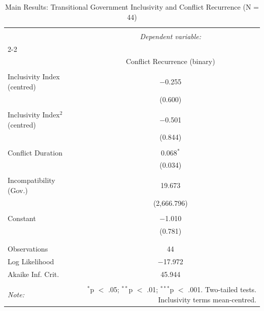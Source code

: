 
\begin{table}[!htbp] \centering 
  \caption{Main Results: Transitional Government Inclusivity and Conflict Recurrence (N = 44)} 
  \label{tab:results_main} 
\begin{tabular}{@{\extracolsep{5pt}}lc} 
\\[-1.8ex]\hline 
\hline \\[-1.8ex] 
 & \multicolumn{1}{c}{\textit{Dependent variable:}} \\ 
\cline{2-2} 
\\[-1.8ex] & Conflict Recurrence (binary) \\ 
\hline \\[-1.8ex] 
 Inclusivity Index (centred) & $-$0.255 \\ 
  & (0.600) \\ 
  & \\ 
 Inclusivity Index$^2$ (centred) & $-$0.501 \\ 
  & (0.844) \\ 
  & \\ 
 Conflict Duration & 0.068$^{*}$ \\ 
  & (0.034) \\ 
  & \\ 
 Incompatibility (Gov.) & 19.673 \\ 
  & (2,666.796) \\ 
  & \\ 
 Constant & $-$1.010 \\ 
  & (0.781) \\ 
  & \\ 
\hline \\[-1.8ex] 
Observations & 44 \\ 
Log Likelihood & $-$17.972 \\ 
Akaike Inf. Crit. & 45.944 \\ 
\hline 
\hline \\[-1.8ex] 
\textit{Note:}  & \multicolumn{1}{r}{$^{*}$p $<$ .05; $^{**}$p $<$ .01; $^{***}$p $<$ .001. Two-tailed tests. Inclusivity terms mean-centred.} \\ 
\end{tabular} 
\end{table} 

